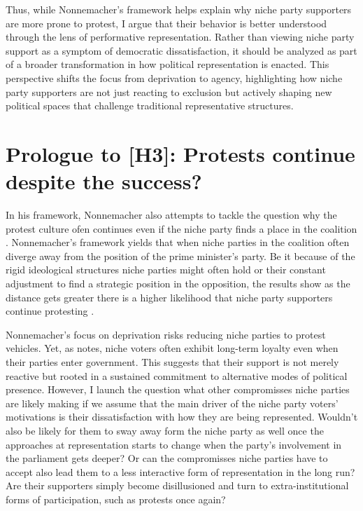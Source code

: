 Thus, while Nonnemacher’s framework helps explain why niche party supporters are more prone to protest, I argue that their behavior is better understood through the lens of performative representation. Rather than viewing niche party support as a symptom of democratic dissatisfaction, it should be analyzed as part of a broader transformation in how political representation is enacted. This perspective shifts the focus from deprivation to agency, highlighting how niche party supporters are not just reacting to exclusion but actively shaping new political spaces that challenge traditional representative structures.


\section{Prologue to [H3]: Protests continue despite the success?}
In his framework, Nonnemacher also attempts to tackle the question why the
protest culture ofen continues even if the niche party finds a place in the
coalition \parencite[34-38]{nonnemacher2023} . Nonnemacher's framework yields that when niche parties in the coalition often diverge away from the position of the prime minister's party. Be it because of the rigid ideological structures niche parties might often hold or their constant adjustment to find a strategic position in the opposition, the results show as the distance gets greater there is a higher likelihood that niche party supporters continue protesting \parencite[36-37]{nonnemacher2023}.

Nonnemacher’s \parencite*{nonnemacher2023} focus on deprivation risks reducing niche parties to protest vehicles. Yet, as \cite{stiers2024} notes, niche voters often exhibit long-term loyalty even when their parties enter government. This suggests that their support is not merely reactive but rooted in a sustained commitment to alternative modes of political presence. However, I launch the question what other compromisses niche parties are likely making if we assume that the main driver of the niche party voters' motivations is their dissatisfaction with how they are being represented. Wouldn't also be likely for them to sway away form the niche party as well once the approaches at representation starts to change when the party's involvement in the parliament gets deeper? Or can the compromisses niche parties have to accept also lead them to a less interactive form of representation in the long run? Are their supporters simply become disillusioned and turn to extra-institutional forms of participation, such as protests once again?


